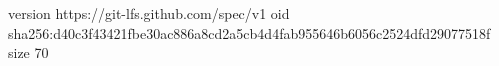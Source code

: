 version https://git-lfs.github.com/spec/v1
oid sha256:d40c3f43421fbe30ac886a8cd2a5cb4d4fab955646b6056c2524dfd29077518f
size 70
